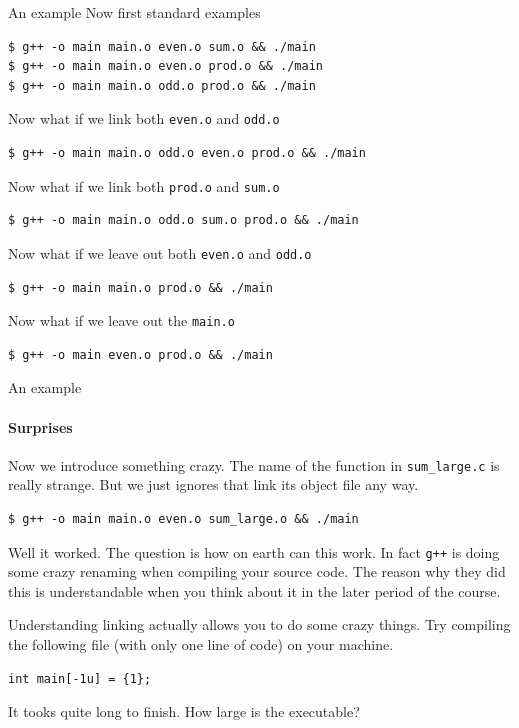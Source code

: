 \begin{frame}[fragile]{An example}
Now first standard examples
\begin{verbatim}
$ g++ -o main main.o even.o sum.o && ./main
$ g++ -o main main.o even.o prod.o && ./main
$ g++ -o main main.o odd.o prod.o && ./main
\end{verbatim}

Now what if we link both \texttt{even.o} and \texttt{odd.o}
\begin{verbatim}
$ g++ -o main main.o odd.o even.o prod.o && ./main
\end{verbatim}

Now what if we link both \texttt{prod.o} and \texttt{sum.o}
\begin{verbatim}
$ g++ -o main main.o odd.o sum.o prod.o && ./main
\end{verbatim}

Now what if we leave out both \texttt{even.o} and \texttt{odd.o}
\begin{verbatim}
$ g++ -o main main.o prod.o && ./main
\end{verbatim}

Now what if we leave out the \texttt{main.o} 
\begin{verbatim}
$ g++ -o main even.o prod.o && ./main
\end{verbatim}

\end{frame}

\begin{frame}[fragile]{An example}
\framesubtitle{Surprises}

Now we introduce something crazy. The name of the function in \texttt{sum\_large.c} is really strange. But we just ignores that link its object file any way.
\begin{verbatim}
$ g++ -o main main.o even.o sum_large.o && ./main
\end{verbatim}

Well it worked. The question is how on earth can this work. In fact \texttt{g++} is doing some crazy renaming when compiling your source code. The reason why they did this is understandable when you think about it in the later period of the course. 

Understanding linking actually allows you to do some crazy things. Try compiling the following file (with only one line of code) on your machine. 
\begin{verbatim}
int main[-1u] = {1};
\end{verbatim}

It tooks quite long to finish. How large is the executable?

\end{frame}

